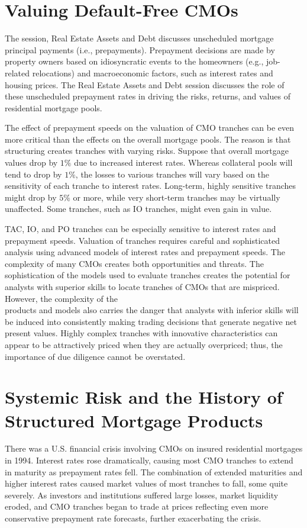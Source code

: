 \documentclass[11pt]{article}
\begin{document}
\section*{Valuing Default-Free CMOs}
The session, Real Estate Assets and Debt discusses unscheduled mortgage principal payments (i.e., prepayments). Prepayment decisions are made by property owners based on idiosyncratic events to the homeowners (e.g., job-related relocations) and macroeconomic factors, such as interest rates and housing prices. The Real Estate Assets and Debt session discusses the role of these unscheduled prepayment rates in driving the risks, returns, and values of residential mortgage pools.

The effect of prepayment speeds on the valuation of CMO tranches can be even more critical than the effects on the overall mortgage pools. The reason is that structuring creates tranches with varying risks. Suppose that overall mortgage values drop by $1 \%$ due to increased interest rates. Whereas collateral pools will tend to drop by $1 \%$, the losses to various tranches will vary based on the sensitivity of each tranche to interest rates. Long-term, highly sensitive tranches might drop by $5 \%$ or more, while very short-term tranches may be virtually unaffected. Some tranches, such as IO tranches, might even gain in value.

TAC, IO, and PO tranches can be especially sensitive to interest rates and prepayment speeds. Valuation of tranches requires careful and sophisticated analysis using advanced models of interest rates and prepayment speeds. The complexity of many CMOs creates both opportunities and threats. The sophistication of the models used to evaluate tranches creates the potential for analysts with superior skills to locate tranches of CMOs that are mispriced. However, the complexity of the\\
products and models also carries the danger that analysts with inferior skills will be induced into consistently making trading decisions that generate negative net present values. Highly complex tranches with innovative characteristics can appear to be attractively priced when they are actually overpriced; thus, the importance of due diligence cannot be overstated.

\section*{Systemic Risk and the History of Structured Mortgage Products}
There was a U.S. financial crisis involving CMOs on insured residential mortgages in 1994. Interest rates rose dramatically, causing most CMO tranches to extend in maturity as prepayment rates fell. The combination of extended maturities and higher interest rates caused market values of most tranches to fall, some quite severely. As investors and institutions suffered large losses, market liquidity eroded, and CMO tranches began to trade at prices reflecting even more conservative prepayment rate forecasts, further exacerbating the crisis.
\end{document}
